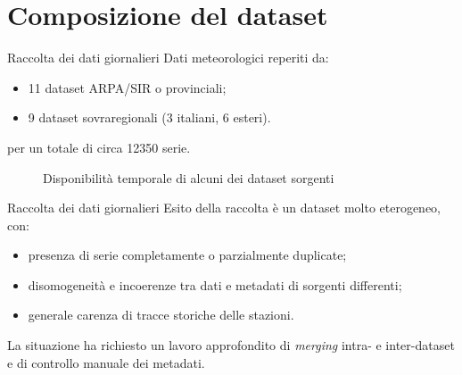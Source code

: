
\section{Composizione del dataset}
\begin{frame}[t]{Raccolta dei dati giornalieri}
  Dati meteorologici reperiti da:
  \begin{itemize}
    \item 11 dataset ARPA/SIR o provinciali;
    \item 9 dataset sovraregionali (3 italiani, 6 esteri).
  \end{itemize}
  per un totale di circa 12350 serie.

  \begin{figure}
    \centering
    \small
    
    \caption*{Disponibilità temporale di alcuni dei dataset sorgenti}
  \end{figure}
\end{frame}

\begin{frame}{Raccolta dei dati giornalieri}
  Esito della raccolta è un dataset molto eterogeneo, con:
  \begin{itemize}
    \item presenza di serie completamente o parzialmente duplicate;
    \item disomogeneità e incoerenze tra dati e metadati di sorgenti differenti;
    \item generale carenza di tracce storiche delle stazioni.
  \end{itemize}

  La situazione ha richiesto un lavoro approfondito di \emph{merging} intra- e inter-dataset e di controllo manuale dei metadati.
\end{frame}

